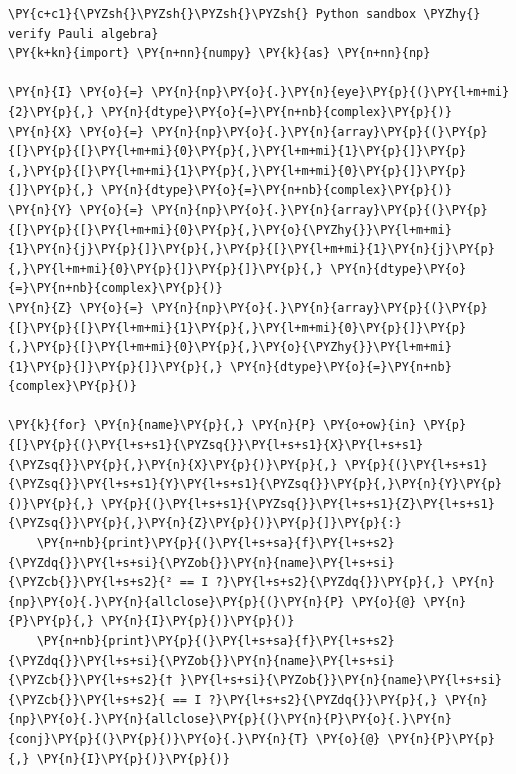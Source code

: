     \begin{tcolorbox}[breakable, size=fbox, boxrule=1pt, pad at break*=1mm,colback=cellbackground, colframe=cellborder]
\begin{Verbatim}[commandchars=\\\{\}]
\PY{c+c1}{\PYZsh{}\PYZsh{}\PYZsh{}\PYZsh{} Python sandbox \PYZhy{} verify Pauli algebra}
\PY{k+kn}{import} \PY{n+nn}{numpy} \PY{k}{as} \PY{n+nn}{np}

\PY{n}{I} \PY{o}{=} \PY{n}{np}\PY{o}{.}\PY{n}{eye}\PY{p}{(}\PY{l+m+mi}{2}\PY{p}{,} \PY{n}{dtype}\PY{o}{=}\PY{n+nb}{complex}\PY{p}{)}
\PY{n}{X} \PY{o}{=} \PY{n}{np}\PY{o}{.}\PY{n}{array}\PY{p}{(}\PY{p}{[}\PY{p}{[}\PY{l+m+mi}{0}\PY{p}{,}\PY{l+m+mi}{1}\PY{p}{]}\PY{p}{,}\PY{p}{[}\PY{l+m+mi}{1}\PY{p}{,}\PY{l+m+mi}{0}\PY{p}{]}\PY{p}{]}\PY{p}{,} \PY{n}{dtype}\PY{o}{=}\PY{n+nb}{complex}\PY{p}{)}
\PY{n}{Y} \PY{o}{=} \PY{n}{np}\PY{o}{.}\PY{n}{array}\PY{p}{(}\PY{p}{[}\PY{p}{[}\PY{l+m+mi}{0}\PY{p}{,}\PY{o}{\PYZhy{}}\PY{l+m+mi}{1}\PY{n}{j}\PY{p}{]}\PY{p}{,}\PY{p}{[}\PY{l+m+mi}{1}\PY{n}{j}\PY{p}{,}\PY{l+m+mi}{0}\PY{p}{]}\PY{p}{]}\PY{p}{,} \PY{n}{dtype}\PY{o}{=}\PY{n+nb}{complex}\PY{p}{)}
\PY{n}{Z} \PY{o}{=} \PY{n}{np}\PY{o}{.}\PY{n}{array}\PY{p}{(}\PY{p}{[}\PY{p}{[}\PY{l+m+mi}{1}\PY{p}{,}\PY{l+m+mi}{0}\PY{p}{]}\PY{p}{,}\PY{p}{[}\PY{l+m+mi}{0}\PY{p}{,}\PY{o}{\PYZhy{}}\PY{l+m+mi}{1}\PY{p}{]}\PY{p}{]}\PY{p}{,} \PY{n}{dtype}\PY{o}{=}\PY{n+nb}{complex}\PY{p}{)}

\PY{k}{for} \PY{n}{name}\PY{p}{,} \PY{n}{P} \PY{o+ow}{in} \PY{p}{[}\PY{p}{(}\PY{l+s+s1}{\PYZsq{}}\PY{l+s+s1}{X}\PY{l+s+s1}{\PYZsq{}}\PY{p}{,}\PY{n}{X}\PY{p}{)}\PY{p}{,} \PY{p}{(}\PY{l+s+s1}{\PYZsq{}}\PY{l+s+s1}{Y}\PY{l+s+s1}{\PYZsq{}}\PY{p}{,}\PY{n}{Y}\PY{p}{)}\PY{p}{,} \PY{p}{(}\PY{l+s+s1}{\PYZsq{}}\PY{l+s+s1}{Z}\PY{l+s+s1}{\PYZsq{}}\PY{p}{,}\PY{n}{Z}\PY{p}{)}\PY{p}{]}\PY{p}{:}
    \PY{n+nb}{print}\PY{p}{(}\PY{l+s+sa}{f}\PY{l+s+s2}{\PYZdq{}}\PY{l+s+si}{\PYZob{}}\PY{n}{name}\PY{l+s+si}{\PYZcb{}}\PY{l+s+s2}{² == I ?}\PY{l+s+s2}{\PYZdq{}}\PY{p}{,} \PY{n}{np}\PY{o}{.}\PY{n}{allclose}\PY{p}{(}\PY{n}{P} \PY{o}{@} \PY{n}{P}\PY{p}{,} \PY{n}{I}\PY{p}{)}\PY{p}{)}
    \PY{n+nb}{print}\PY{p}{(}\PY{l+s+sa}{f}\PY{l+s+s2}{\PYZdq{}}\PY{l+s+si}{\PYZob{}}\PY{n}{name}\PY{l+s+si}{\PYZcb{}}\PY{l+s+s2}{† }\PY{l+s+si}{\PYZob{}}\PY{n}{name}\PY{l+s+si}{\PYZcb{}}\PY{l+s+s2}{ == I ?}\PY{l+s+s2}{\PYZdq{}}\PY{p}{,} \PY{n}{np}\PY{o}{.}\PY{n}{allclose}\PY{p}{(}\PY{n}{P}\PY{o}{.}\PY{n}{conj}\PY{p}{(}\PY{p}{)}\PY{o}{.}\PY{n}{T} \PY{o}{@} \PY{n}{P}\PY{p}{,} \PY{n}{I}\PY{p}{)}\PY{p}{)}


\end{Verbatim}
\end{tcolorbox}
